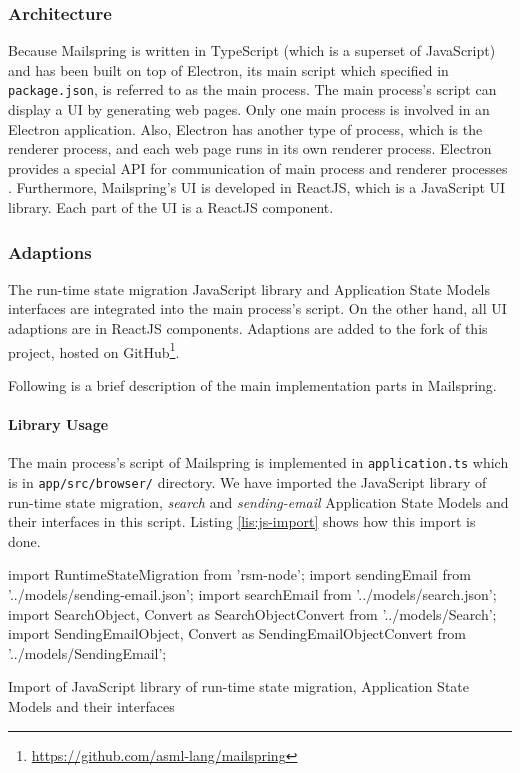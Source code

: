 \subsubsection{Architecture}
Because Mailspring is written in TypeScript (which is a superset of JavaScript) and has been built on top of Electron, its main script which specified in \lstinline[basicstyle=\ttfamily]{package.json}, is referred to as the main process. The main process's script can display a UI by generating web pages. Only one main process is involved in an Electron application. Also, Electron has another type of process, which is the renderer process, and each web page runs in its own renderer process. Electron provides a special API for communication of main process and renderer processes \cite{electron}. Furthermore, Mailspring's UI is developed in ReactJS, which is a JavaScript UI library. Each part of the UI is a ReactJS component.

\subsubsection{Adaptions}
The run-time state migration JavaScript library and Application State Models interfaces are integrated into the main process's script. On the other hand, all UI adaptions are in ReactJS components. Adaptions are added to the fork of this project, hosted on GitHub\footnote{\url{https://github.com/asml-lang/mailspring}}. 

Following is a brief description of the main implementation parts in Mailspring.

\paragraph{Library Usage}
The main process's script of Mailspring is implemented in \lstinline[basicstyle=\ttfamily]{application.ts} which is in \lstinline[basicstyle=\ttfamily]{app/src/browser/} directory.
We have imported the JavaScript library of run-time state migration, \textit{search} and \textit{sending-email} Application State Models and their interfaces in this script. Listing \ref{lis:js-import} shows how this import is done.

\FloatBarrier
\begin{code}
\begin{js2}
import RuntimeStateMigration from 'rsm-node';
import sendingEmail from '../models/sending-email.json';
import searchEmail from '../models/search.json';
import { 
    SearchObject,
    Convert as SearchObjectConvert
} from '../models/Search';
import {
    SendingEmailObject,
    Convert as SendingEmailObjectConvert
} from '../models/SendingEmail';
\end{js2}
\caption{Import of JavaScript library of run-time state migration, Application State Models and their interfaces}
\label{lis:js-import}
\end{code}
\FloatBarrier

